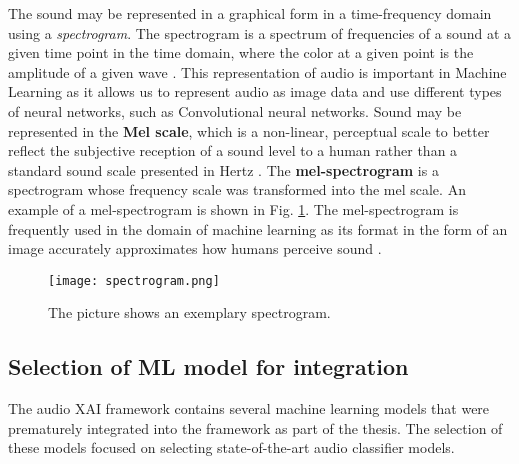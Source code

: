 \documentclass[
    bindingoffset=5mm,  %
    footnoteindent=3mm, %
    hyphenation=true    %
]{src/wut-thesis}
\begin{document}
The sound may be represented in a graphical form in a time-frequency domain using a \emph{spectrogram}.
The spectrogram is a spectrum of frequencies of a sound at a given time point in the time domain,
where the color at a given point is the amplitude of a given wave \cite{Zhang2019AudioRU}.
This representation of audio is important in Machine Learning as it allows us to represent audio as image
data and use different types of neural networks, such as Convolutional neural networks. Sound may be 
represented in the \textbf{Mel scale}, which is a non-linear, perceptual scale to better reflect the subjective
reception of a sound level to a human rather than a standard sound scale presented in Hertz \cite{Volkmann2005}.
The \textbf{mel-spectrogram} is a spectrogram whose frequency scale was transformed into the mel scale.
An example of a mel-spectrogram is shown in Fig. \ref{fig:SpectrogramImage}.
The mel-spectrogram is frequently used in the domain of machine learning as its format in the form
of an image accurately approximates how humans perceive sound \cite{Zhang2019AudioRU}.

\begin{figure}[h!] %
    \centering
    \texttt{[image: spectrogram.png]}
    \caption{The picture shows an exemplary spectrogram.}
    \label{fig:SpectrogramImage}
\end{figure}

\subsection{Selection of ML model for integration} \label{ch2:ModelSelection}

The audio XAI framework contains several machine learning models that were prematurely integrated
into the framework as part of the thesis. The selection of these models focused on
selecting state-of-the-art audio classifier models.
\end{document}
